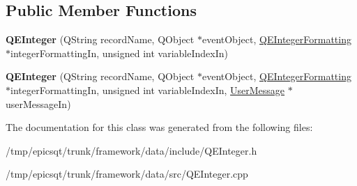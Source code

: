 \subsection*{Public Member Functions}
\begin{DoxyCompactItemize}
\item 
\hypertarget{classQEInteger_abfd6176d5b3d41644c251806f64c6ca0}{
{\bfseries QEInteger} (QString recordName, QObject $\ast$eventObject, \hyperlink{classQEIntegerFormatting}{QEIntegerFormatting} $\ast$integerFormattingIn, unsigned int variableIndexIn)}
\label{classQEInteger_abfd6176d5b3d41644c251806f64c6ca0}

\item 
\hypertarget{classQEInteger_aa7f19914d1e1ec7671fec7be219d9076}{
{\bfseries QEInteger} (QString recordName, QObject $\ast$eventObject, \hyperlink{classQEIntegerFormatting}{QEIntegerFormatting} $\ast$integerFormattingIn, unsigned int variableIndexIn, \hyperlink{classUserMessage}{UserMessage} $\ast$userMessageIn)}
\label{classQEInteger_aa7f19914d1e1ec7671fec7be219d9076}

\end{DoxyCompactItemize}


The documentation for this class was generated from the following files:\begin{DoxyCompactItemize}
\item 
/tmp/epicsqt/trunk/framework/data/include/QEInteger.h\item 
/tmp/epicsqt/trunk/framework/data/src/QEInteger.cpp\end{DoxyCompactItemize}
